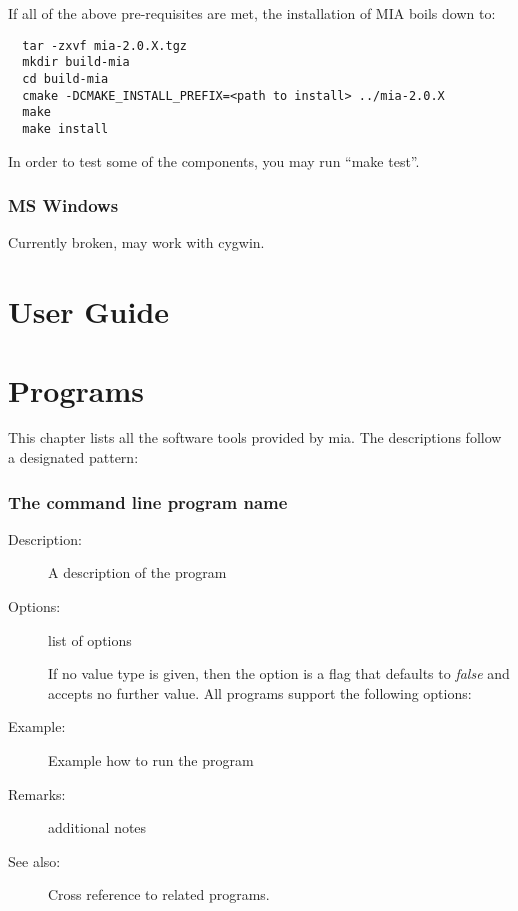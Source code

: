 \documentclass[english, 10pt, a4paper,headsepline,openany]{scrbook}
\begin{document}
If all of the above pre-requisites are met, the installation of MIA boils down to:

\lstset{language=bash}
\begin{lstlisting}
  tar -zxvf mia-2.0.X.tgz
  mkdir build-mia
  cd build-mia
  cmake -DCMAKE_INSTALL_PREFIX=<path to install> ../mia-2.0.X
  make
  make install
\end{lstlisting}
In order to test some of the components, you may run ``make test''. 

\subsection{MS Windows} 

Currently broken, may work with cygwin. 

\chapter{User Guide}



\chapter{Programs}
\label{ch:prog}


This chapter lists all the software tools provided by mia. 
The descriptions follow a designated pattern: 

\subsection*{The command line program name}
\begin{description}
\item [Description:]A description of the program
\item [Options:] list of options

\noindent 
{}

\noindent 
If no value type is given, then the option is a flag that defaults to \emph{false} and accepts no 
     further value. 
All programs support the following options: 


\item [Example:] Example how to run the program 

\item [Remarks:] additional notes
\item [See also:] Cross reference to related programs. 
\end{description}
\end{document}
